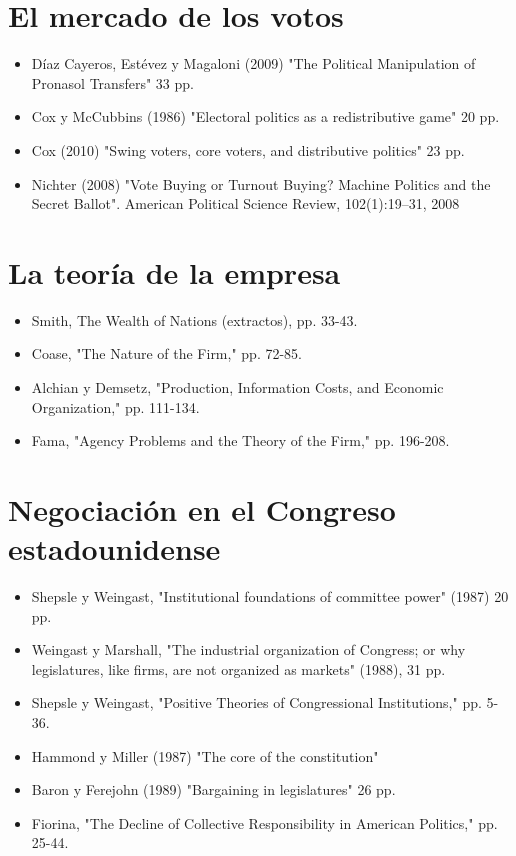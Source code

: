 \documentclass{article}
\begin{document}
\section{El mercado de los votos}
\label{sec:orgc4c725d}
\begin{itemize}
\item Díaz Cayeros, Estévez y Magaloni (2009) "The Political Manipulation of Pronasol Transfers" 33 pp.
\item Cox y McCubbins (1986) "Electoral politics as a redistributive game" 20 pp.
\item Cox (2010) "Swing voters, core voters, and distributive politics" 23 pp.
\item Nichter (2008) "Vote Buying or Turnout Buying? Machine Politics and the Secret Ballot". American Political Science Review, 102(1):19–31, 2008
\end{itemize}

\section{La teoría de la empresa}
\label{sec:org72c674f}
\begin{itemize}
\item Smith, The Wealth of Nations (extractos), pp. 33-43.
\item Coase, "The Nature of the Firm," pp. 72-85.
\item Alchian y Demsetz, "Production, Information Costs, and Economic Organization," pp. 111-134.
\item Fama, "Agency Problems and the Theory of the Firm," pp. 196-208.
\end{itemize}

\section{Negociación en el Congreso estadounidense}
\label{sec:org6f2a45a}
\begin{itemize}
\item Shepsle y Weingast, "Institutional foundations of committee power" (1987) 20 pp.
\item Weingast y Marshall, "The industrial organization of Congress; or why legislatures, like firms, are not organized as markets" (1988), 31 pp.
\item Shepsle y Weingast, "Positive Theories of Congressional Institutions," pp. 5-36.
\item Hammond y Miller (1987) "The core of the constitution"
\item Baron y Ferejohn (1989) "Bargaining in legislatures" 26 pp.
\item Fiorina, "The Decline of Collective Responsibility in American Politics," pp. 25-44.
\end{itemize}
\end{document}
